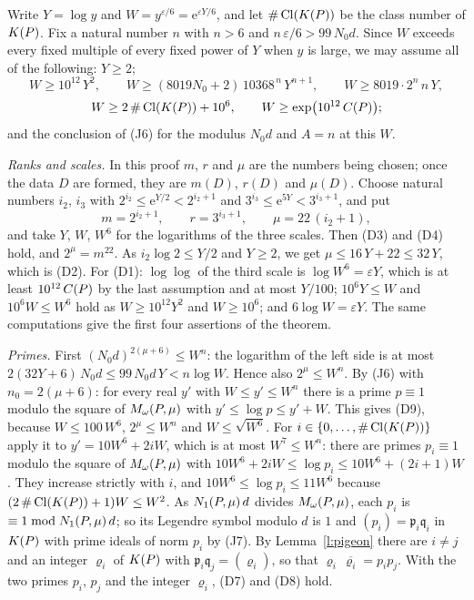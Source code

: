 \documentclass[11pt,a4paper]{article}
\makeatletter
\theoremstyle{plainx}
\theoremstyle{uprightx}
\renewenvironment{proof}[1][Proof]{\par\pushQED{\qed}\normalfont\topsep0pt\partopsep0pt
  \trivlist\item[\hskip\labelsep\itshape #1.]\ignorespaces}{\popQED\endtrivlist\@endpefalse}
\newcommand{\cj}[1]{\overline{#1}}
\newcommand{\Dm}[1]{m(#1)}
\newcommand{\Dr}[1]{r(#1)}
\newcommand{\Dmu}[1]{\mu(#1)}
\newcommand{\clno}[1]{\#\operatorname{Cl}(\KP{#1})}
\makeatother
\begin{document}
\begin{proof}[Proof of Theorem A]
Write $Y=\log y$ and $W=y^{\varepsilon/6}=\mathrm{e}^{\varepsilon Y/6}$, and let $\clno{P}$ be the class number of $K(P)$.
Fix a natural number $n$ with $n>6$ and $n\,\varepsilon/6>99\,N_0d$. Since $W$ exceeds every fixed multiple of every
fixed power of $Y$ when $y$ is large, we may assume all of the following: $Y\ge2$;
\[W\ge10^{12}\,Y^2,\qquad W\ge(8019N_0+2)\,10368^{\,n}\,Y^{n+1},\qquad W\ge8019\cdot2^n\,n\,Y,\]
\[W\ge2\,\clno{P}+10^6,\qquad W\ge\exp\bigl(10^{12}\,\CP{P}\bigr);\]
and the conclusion of (J6) for the modulus $N_0d$ and $A=n$ at this $W$.

\emph{Ranks and scales.} In this proof $m$, $r$ and $\mu$ are the numbers being chosen; once the data $D$ are formed, they are
$\Dm{D}$, $\Dr{D}$ and $\Dmu{D}$. Choose natural numbers $i_2$, $i_3$ with $2^{i_2}\le \mathrm{e}^{Y/2}<2^{i_2+1}$ and
$3^{i_3}\le \mathrm{e}^{5Y}<3^{i_3+1}$, and put
\[m=2^{i_2+1},\qquad r=3^{i_3+1},\qquad\mu=22\,(i_2+1),\]
and take $Y$, $W$, $W^6$ for the logarithms of the three scales. Then (D3) and (D4) hold, and $2^\mu=m^{22}$. As
$i_2\log2\le Y/2$ and $Y\ge2$, we get $\mu\le16\,Y+22\le32\,Y$, which is (D2). For (D1):
$\log\log$ of the third scale is $\log W^6=\varepsilon Y$, which is at least $10^{12}\,C(P)$ by the last
assumption and at most $Y/100$; $10^6Y\le W$ and $10^6W\le W^6$ hold as $W\ge10^{12}Y^2$ and $W\ge10^6$; and
$6\log W=\varepsilon Y$. The same computations give the first four assertions of the theorem.

\emph{Primes.} First $(N_0d)^{2(\mu+6)}\le W^n$: the logarithm of the left side is at most
$2(32Y+6)\,N_0d\le99\,N_0d\,Y<n\log W$. Hence also $2^\mu\le W^n$. By (J6) with $n_0=2(\mu+6)$: for every real $y'$
with $W\le y'\le W^n$ there is a prime $p\equiv1$ modulo the square of $M_\omega(P,\mu)$ with
$y'\le\log p\le y'+W$. This gives (D9), because $W\le100\,W^6$, $2^\mu\le W^n$ and $W\le\sqrt{W^6}$. For
$i\in\{0,\dots,\clno{P}\}$ apply it to $y'=10W^6+2iW$, which is at most $W^7\le W^n$: there are primes $p_i\equiv1$
modulo the square of $M_\omega(P,\mu)$ with $10W^6+2iW\le\log p_i\le10W^6+(2i+1)W$. They increase strictly with $i$, and
$10W^6\le\log p_i\le11W^6$ because $(2\,\clno{P}+1)W\le W^2$. As $N_1(P,\mu)\,d$ divides $M_\omega(P,\mu)$, each $p_i$
is $\equiv1\bmod N_1(P,\mu)\,d$; so its Legendre symbol modulo $d$ is $1$ and $(p_i)=\mathfrak{p}_i\mathfrak{q}_i$ in
$K(P)$ with prime ideals of norm $p_i$ by (J7). By Lemma~\ref{l:pigeon} there are $i\ne j$ and an integer $\varrho_i$
of $K(P)$ with $\mathfrak{p}_i\mathfrak{q}_j=(\varrho_i)$, so that $\varrho_i\,\cj{\varrho_i}=p_ip_j$. With the two primes $p_i$, $p_j$
and the integer $\varrho_i$, (D7) and (D8) hold.


\end{proof}
\end{document}
